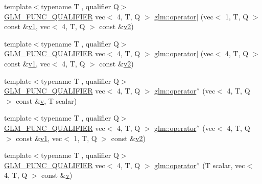 \begin{DoxyCompactItemize}
\item 
{\footnotesize template$<$typename T , qualifier Q$>$ }\\\mbox{\hyperlink{setup_8hpp_a33fdea6f91c5f834105f7415e2a64407}{G\+L\+M\+\_\+\+F\+U\+N\+C\+\_\+\+Q\+U\+A\+L\+I\+F\+I\+ER}} vec$<$ 4, T, Q $>$ \mbox{\hyperlink{namespaceglm_a237a1e32e9ac59768b61dec347877aba}{glm\+::operator$\vert$}} (vec$<$ 1, T, Q $>$ const \&\mbox{\hyperlink{_s_d_l__opengl__glext_8h_a435c176a02c061b43e19bdf7c86cceae}{v1}}, vec$<$ 4, T, Q $>$ const \&\mbox{\hyperlink{_s_d_l__opengl__glext_8h_a0928f6d0f0f794ba000a21dfae422136}{v2}})
\item 
{\footnotesize template$<$typename T , qualifier Q$>$ }\\\mbox{\hyperlink{setup_8hpp_a33fdea6f91c5f834105f7415e2a64407}{G\+L\+M\+\_\+\+F\+U\+N\+C\+\_\+\+Q\+U\+A\+L\+I\+F\+I\+ER}} vec$<$ 4, T, Q $>$ \mbox{\hyperlink{namespaceglm_aafbc0273bc7f4b687f64735643b8cbcd}{glm\+::operator$\vert$}} (vec$<$ 4, T, Q $>$ const \&\mbox{\hyperlink{_s_d_l__opengl__glext_8h_a435c176a02c061b43e19bdf7c86cceae}{v1}}, vec$<$ 4, T, Q $>$ const \&\mbox{\hyperlink{_s_d_l__opengl__glext_8h_a0928f6d0f0f794ba000a21dfae422136}{v2}})
\item 
{\footnotesize template$<$typename T , qualifier Q$>$ }\\\mbox{\hyperlink{setup_8hpp_a33fdea6f91c5f834105f7415e2a64407}{G\+L\+M\+\_\+\+F\+U\+N\+C\+\_\+\+Q\+U\+A\+L\+I\+F\+I\+ER}} vec$<$ 4, T, Q $>$ \mbox{\hyperlink{namespaceglm_a827d4de04f08e0d20d64b569fd8c2cc6}{glm\+::operator$^\wedge$}} (vec$<$ 4, T, Q $>$ const \&\mbox{\hyperlink{_s_d_l__opengl_8h_a10a82eabcb59d2fcd74acee063775f90}{v}}, T scalar)
\item 
{\footnotesize template$<$typename T , qualifier Q$>$ }\\\mbox{\hyperlink{setup_8hpp_a33fdea6f91c5f834105f7415e2a64407}{G\+L\+M\+\_\+\+F\+U\+N\+C\+\_\+\+Q\+U\+A\+L\+I\+F\+I\+ER}} vec$<$ 4, T, Q $>$ \mbox{\hyperlink{namespaceglm_aaeedaa2563ddbfa5b5a28b9e7eefe760}{glm\+::operator$^\wedge$}} (vec$<$ 4, T, Q $>$ const \&\mbox{\hyperlink{_s_d_l__opengl__glext_8h_a435c176a02c061b43e19bdf7c86cceae}{v1}}, vec$<$ 1, T, Q $>$ const \&\mbox{\hyperlink{_s_d_l__opengl__glext_8h_a0928f6d0f0f794ba000a21dfae422136}{v2}})
\item 
{\footnotesize template$<$typename T , qualifier Q$>$ }\\\mbox{\hyperlink{setup_8hpp_a33fdea6f91c5f834105f7415e2a64407}{G\+L\+M\+\_\+\+F\+U\+N\+C\+\_\+\+Q\+U\+A\+L\+I\+F\+I\+ER}} vec$<$ 4, T, Q $>$ \mbox{\hyperlink{namespaceglm_a1d345b5e805a0466b9875f4ecfaa4a4c}{glm\+::operator$^\wedge$}} (T scalar, vec$<$ 4, T, Q $>$ const \&\mbox{\hyperlink{_s_d_l__opengl_8h_a10a82eabcb59d2fcd74acee063775f90}{v}})

\end{DoxyCompactItemize}
